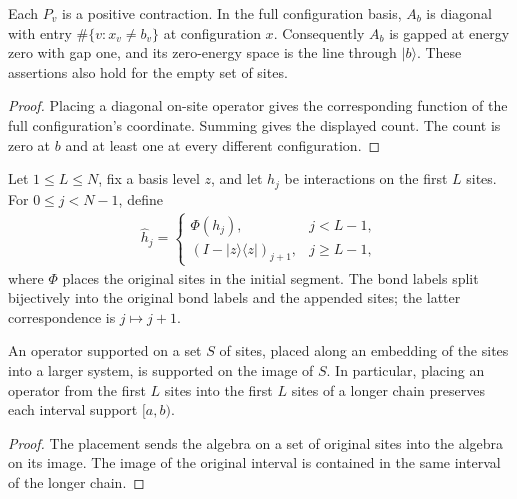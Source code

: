 \begin{lemma}
    \label{thm:lvv_product_basis_penalty}
    \leanok
    Each $P_v$ is a positive contraction. In the full configuration basis,
    $A_b$ is diagonal with entry $\#\{v:x_v\ne b_v\}$ at configuration $x$.
    Consequently $A_b$ is gapped at energy zero with gap one, and its
    zero-energy space is the line through $|b\rangle$. These assertions also
    hold for the empty set of sites.
\end{lemma}
\begin{proof}
    \leanok
    Placing a diagonal on-site operator gives the corresponding function of
    the full configuration's coordinate. Summing gives the displayed count.
    The count is zero at $b$ and at least one at every different configuration.
\end{proof}

\begin{definition}
    \label{def:lvv_padded_interaction}
    \leanok
    Let $1\le L\le N$, fix a basis level $z$, and let $h_j$ be interactions
    on the first $L$ sites. For $0\le j<N-1$, define
    \begin{align*}
        \widehat h_j=
        \begin{cases}
            \Phi(h_j),                     & j<L-1,    \\
            (I-|z\rangle\langle z|)_{j+1}, & j\ge L-1,
        \end{cases}
    \end{align*}
    where $\Phi$ places the original sites in the initial segment.
    The bond labels split bijectively into the original bond labels and the
    appended sites; the latter correspondence is $j\mapsto j+1$.
\end{definition}

\begin{lemma}
    \label{thm:lvv_prefix_support}
    \leanok
    An operator supported on a set $S$ of sites, placed along an embedding
    of the sites into a larger system, is supported on the image of $S$.
    In particular, placing an operator from the first $L$ sites into the
    first $L$ sites of a longer chain preserves each interval support
    $[a,b)$.
\end{lemma}
\begin{proof}
    \leanok
    The placement sends the algebra on a set of original sites into the
    algebra on its image. The image of the original interval is contained
    in the same interval of the longer chain.
\end{proof}

